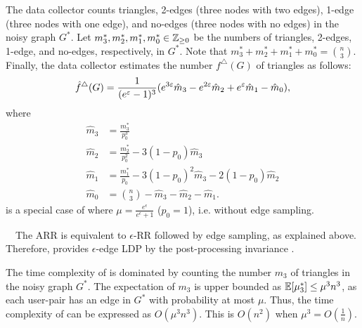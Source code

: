 The data collector counts triangles, 2-edges (three nodes with two edges), 1-edge (three nodes with one edge), and no-edges (three nodes with no edges) in the noisy graph $G^*$.
Let $m_3^*, m_2^*, m_1^*, m_0^* \in \mathbb{Z}_{\ge0}$ be the numbers of triangles, 2-edges, 1-edge, and no-edges, respectively, in $G^*$.
Note that $m_3^* + m_2^* + m_1^* + m_0^* = \binom{n}{3}$.
Finally, the data collector estimates the number $f^\triangle(G)$ of triangles as follows:
\begin{align}
    \hat{f}^\triangle(G) = \frac{1}{(e^\varepsilon-1)^3}(e^{3\varepsilon} \hat{m}_3 - e^{2\varepsilon} \hat{m}_2 + e^\varepsilon \hat{m}_1 - \hat{m}_0),
    \label{chap3-eq:ARR_hf}
\end{align}
where
\begin{align}
\hat{m}_3 &= \textstyle{\frac{m_3^*}{p_0^3}} \label{chap3-eq:ARR_m3}\\
\hat{m}_2 &= \textstyle{\frac{m_2^*}{p_0^2} - 3(1-p_0)\hat{m}_3} \label{chap3-eq:ARR_m2}\\
\hat{m}_1 &= \textstyle{\frac{m_1^*}{p_0} - 3(1-p_0)^2\hat{m}_3 - 2(1-p_0)\hat{m}_2} \label{chap3-eq:ARR_m1}\\
\hat{m}_0 &= \textstyle{\binom{n}{3} - \hat{m}_3 - \hat{m}_2 - \hat{m}_1}. \label{chap3-eq:ARR_m0}
\end{align}
\AlgRRTri{} is a special case of \AlgARRTri{} where $\mu = \frac{e^\epsilon}{e^\epsilon + 1}$ ($p_0 = 1$), i.e. without edge sampling.

\smallskip
{}~~The ARR is equivalent to $\epsilon$-RR followed by edge sampling, as explained above.
Therefore, \AlgARRTri{} provides $\epsilon$-edge LDP by the post-processing invariance \cite{DP}.

The time complexity of \AlgARRTri{} is dominated by counting the number $m_3$ of triangles in the noisy graph $G^*$.
The expectation of $m_3$ is upper bounded as $\operatorname{\mathbb{E}}[\mu_3^*] \leq \mu^3 n^3$, as each user-pair has an edge in $G^*$ with probability at most $\mu$.
Thus, the time complexity of \AlgARRTri{} can be expressed as $O(\mu^3 n^3)$.
This is $O(n^2)$ when $\mu^3 = O(\frac{1}{n})$.

